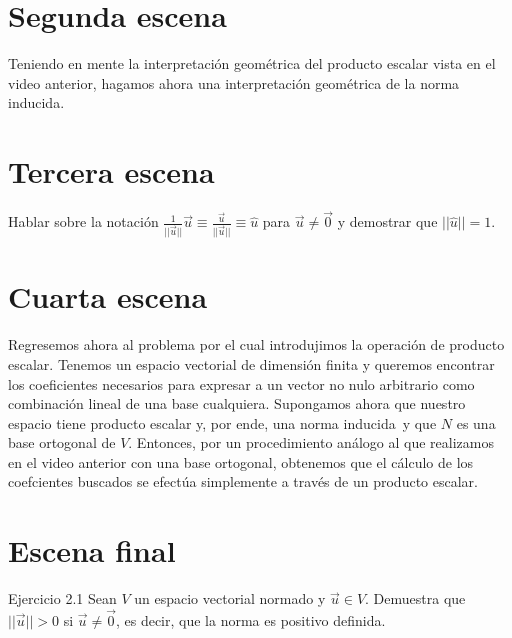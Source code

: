 \documentclass[12pt,dvipsnames]{article}
\numberwithin{equation}{section}
\begin{document}
\newpage
\section{Segunda escena}

Teniendo en mente la interpretación geométrica del producto escalar vista en el video anterior, hagamos ahora una interpretación geométrica de la norma inducida.


\newpage
\section{Tercera escena}

Hablar sobre la notación $\frac{1}{||\vec{u}||}\vec{u}\equiv \frac{\vec{u}}{||\vec{u}||}\equiv \hat{u}$ para $\vec{u}\neq\vec{0}$ y demostrar que $||\hat{u}|| = 1$.


\newpage
\section{Cuarta escena}

Regresemos ahora al problema por el cual introdujimos la operación de producto escalar. Tenemos un espacio vectorial de dimensión finita y queremos encontrar los coeficientes necesarios para expresar a un vector no nulo arbitrario como combinación lineal de una base cualquiera. Supongamos ahora que nuestro espacio tiene producto escalar \textemdash y, por ende, una norma inducida\textemdash \ y que $N$ es una base ortogonal de $V$. Entonces, por un procedimiento análogo al que realizamos en el video anterior con una base ortogonal, obtenemos que el cálculo de los coefcientes buscados se efectúa simplemente a través de un producto escalar.


\newpage
\section{Escena final}


Ejercicio 2.1 Sean $V$ un espacio vectorial normado y $\vec{u}\in V$. Demuestra que $||\vec{u}||>0$ si $\vec{u}\neq \vec{0}$, es decir, que la norma es positivo definida.
\end{document}
